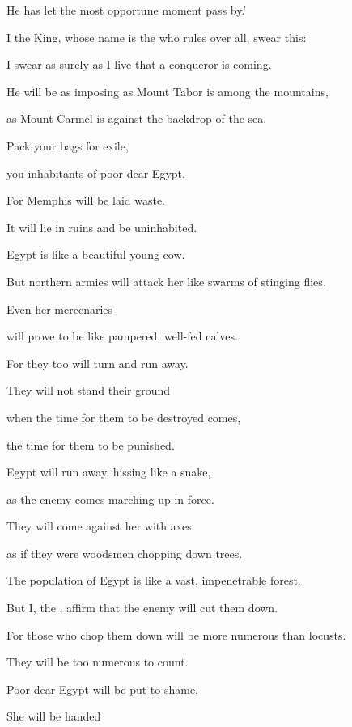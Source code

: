 {\par }{\Q He has let the most opportune moment pass by.’
\par }{\Q {}I the King,
whose name
is the
{}
who rules over all,
swear this:
\par }{\Q I swear as surely as I
live
that
a conqueror is coming.
\par }{\Q He will be as imposing
as Mount Tabor
is among the mountains,
\par }{\Q as Mount Carmel
is against the backdrop
of the sea.
\par }{\Q {}Pack your bags
for exile,
\par }{\Q you inhabitants
of poor dear
Egypt.
\par }{\Q For
Memphis
will be laid waste.
\par }{\Q It will lie in ruins
and be uninhabited.
\par }{\Q {}Egypt
is like a beautiful
young cow.
\par }{\Q But northern
armies will attack
her like swarms of stinging flies.
\par }{\Q {}Even
her mercenaries
\par }{\Q will prove to be like pampered, well-fed
calves.
\par }{\Q For
they
too
will turn
and run away.
\par }{\Q They will not
stand
their ground
\par }{\Q when the time
for them to be destroyed
comes,
\par }{\Q the time
for them to be punished.
\par }{\Q {}Egypt will run away,
hissing like a snake,
\par }{\Q as the enemy comes marching up in force.
\par }{\Q They will come
against her with axes
\par }{\Q as if
they were
woodsmen
chopping
down trees.
\par }{\Q {}The population of Egypt is like a vast, impenetrable
forest.
\par }{\Q But
I, the
{}, affirm
that
the enemy will cut them
down.
\par }{\Q For
those who chop them
down will be more numerous
than locusts.
\par }{\Q They
will be too numerous to count.
\par }{\Q {}Poor dear
Egypt
will be put
to shame.
\par }{\Q She will be handed
}
